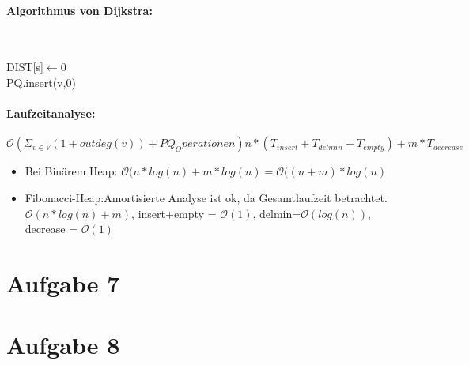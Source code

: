 \documentclass[10pt,a4paper]{article}
\begin{document}
\paragraph{Algorithmus von Dijkstra:}~
\begin{algorithm}
	DIST[s]$\leftarrow$0 \\
	PQ.insert(v,0) \\
\end{algorithm}

\paragraph{Laufzeitanalyse:}
	$\mathcal{O}(\Sigma_{v\in V}(1+outdeg(v))+PQ_Operationen)n*(T_{insert}+T_{delmin}+T_{empty})+m*T_{decrease}$
	\begin{itemize}
		\item Bei Binärem Heap: $\mathcal{O}(n*log(n)+m*log(n)=\mathcal{O}((n+m)*log(n)$
		\item Fibonacci-Heap:Amortisierte Analyse ist ok, da Gesamtlaufzeit betrachtet. $\mathcal{O}(n*log(n)+m)$, insert+empty = $\mathcal{O}(1)$, delmin=$\mathcal{O}(log(n))$, decrease = $\mathcal{O}(1)$
	\end{itemize}

\section*{Aufgabe 7}


\section*{Aufgabe 8}
\end{document}
